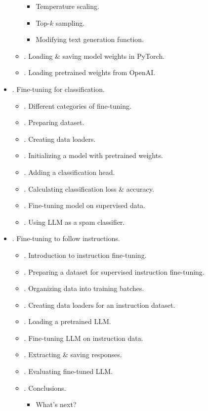 \documentclass{article}
\begin{document}
\begin{itemize}
\begin{itemize}
\begin{itemize}
			\item {\sf Temperature scaling.}
			\item {\sf Top-$k$ sampling.}
			\item {\sf Modifying text generation function.}
		\end{itemize}
		\item {. Loading \& saving model weights in PyTorch.}
		\item {. Loading pretrained weights from OpenAI.}
	\end{itemize}
	\item {. Fine-tuning for classification.}
	\begin{itemize}
		\item {. Different categories of fine-tuning.}
		\item {. Preparing dataset.}
		\item {. Creating data loaders.}
		\item {. Initializing a model with pretrained weights.}
		\item {. Adding a classification head.}
		\item {. Calculating classification loss \& accuracy.}
		\item {. Fine-tuning model on supervised data.}
		\item {. Using LLM as a spam classifier.}
	\end{itemize}
	\item {. Fine-tuning to follow instructions.}
	\begin{itemize}
		\item {. Introduction to instruction fine-tuning.}
		\item {. Preparing a dataset for supervised instruction fine-tuning.}
		\item {. Organizing data into training batches.}
		\item {. Creating data loaders for an instruction dataset.}
		\item {. Loading a pretrained LLM.}
		\item {. Fine-tuning LLM on instruction data.}
		\item {. Extracting \& saving responses.}
		\item {. Evaluating fine-tuned LLM.}
		\item {. Conclusions.}
		\begin{itemize}
			\item {\sf What's next?}

\end{itemize}
\end{itemize}
\end{itemize}
\end{document}
